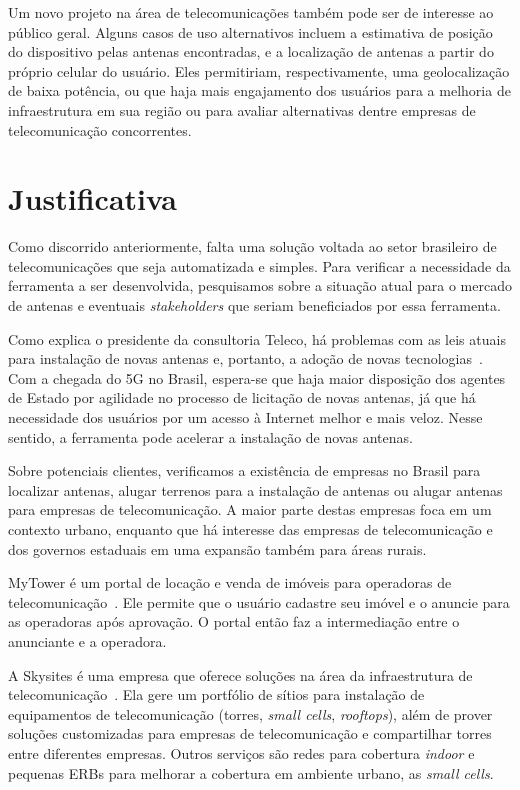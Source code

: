 \documentclass[]{politex}
\begin{document}
Um novo projeto na área de telecomunicações também pode ser de interesse ao
público geral. Alguns casos de uso alternativos incluem a estimativa de posição
do dispositivo pelas antenas encontradas, e a localização de antenas a partir
do próprio celular do usuário. Eles permitiriam, respectivamente, uma
geolocalização de baixa potência, ou que haja mais engajamento dos usuários para
a melhoria de infraestrutura em sua região ou para avaliar alternativas dentre
empresas de telecomunicação concorrentes.

\section{Justificativa}
Como discorrido anteriormente, falta uma solução voltada ao setor brasileiro de
telecomunicações que seja automatizada e simples. Para verificar a necessidade
da ferramenta a ser desenvolvida, pesquisamos sobre a situação atual para o
mercado de antenas e eventuais \textit{stakeholders} que seriam beneficiados
por essa ferramenta.

Como explica o presidente da consultoria Teleco, há problemas com as leis atuais
para instalação de novas antenas e, portanto, a adoção de novas
tecnologias~\cite{tude}. Com a chegada do 5G no Brasil, espera-se que haja maior
disposição dos agentes de Estado por agilidade no processo de licitação de novas
antenas, já que há necessidade dos usuários por um acesso à Internet melhor e
mais veloz. Nesse sentido, a ferramenta pode acelerar a instalação de novas
antenas.

Sobre potenciais clientes, verificamos a existência de empresas no Brasil para
localizar antenas, alugar terrenos para a instalação de antenas ou alugar
antenas para empresas de telecomunicação. A maior parte destas empresas foca em
um contexto urbano, enquanto que há interesse das empresas de telecomunicação
e dos governos estaduais em uma expansão também para áreas rurais.

MyTower é um portal de locação e venda de imóveis para operadoras de
telecomunicação~\cite{mytower}. Ele permite que o usuário cadastre seu imóvel
e o anuncie para as operadoras após aprovação.
O portal então faz a intermediação entre o anunciante e a operadora.

A Skysites é uma empresa que oferece soluções na área da infraestrutura de
telecomunicação~\cite{skysites}. Ela gere um portfólio de sítios para
instalação de equipamentos de telecomunicação (torres, \textit{small cells}, \textit{rooftops}), além de prover soluções customizadas para empresas de telecomunicação e
compartilhar torres entre diferentes empresas. Outros serviços são redes para
cobertura \textit{indoor} e pequenas ERBs para melhorar a cobertura em ambiente
urbano, as \textit{small cells}.
\end{document}
